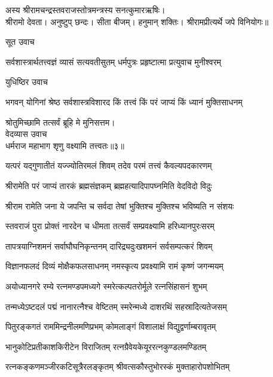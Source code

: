 
\clearpage
{}
अस्य श्रीरामचन्द्रस्तवराजस्तोत्रमन्त्रस्य सनत्कुमारऋषिः। \\
श्रीरामो देवता। अनुष्टुप् छन्दः। सीता बीजम्। हनुमान् शक्तिः। 
श्रीरामप्रीत्यर्थे जपे विनियोगः॥

सूत उवाच

\twolineshloka
{सर्वशास्त्रार्थतत्त्वज्ञं व्यासं सत्यवतीसुतम्}
{धर्मपुत्रः प्रहृष्टात्मा प्रत्युवाच मुनीश्वरम्}%

युधिष्ठिर उवाच

\twolineshloka
{भगवन् योगिनां श्रेष्ठ सर्वशास्त्रविशारद}
{किं तत्त्वं किं परं जाप्यं किं ध्यानं मुक्तिसाधनम्}%

{श्रोतुमिच्छामि तत्सर्वं ब्रूहि मे मुनिसत्तम।}\\
{वेदव्यास उवाच}\\
{धर्मराज महाभाग शृणु वक्ष्यामि तत्त्वतः॥३॥}%

\twolineshloka
{यत्परं यद्गुणातीतं यज्ज्योतिरमलं शिवम्}
{तदेव परमं तत्त्वं कैवल्यपदकारणम्}%

\twolineshloka
{श्रीरामेति परं जाप्यं तारकं ब्रह्मसंज्ञकम्}
{ब्रह्महत्यादिपापघ्नमिति वेदविदो विदुः}%

\twolineshloka
{श्रीराम रामेति जना ये जपन्ति च सर्वदा}
{तेषां भुक्तिश्च मुक्तिश्च भविष्यति न संशयः}%

\twolineshloka
{स्तवराजं पुरा प्रोक्तं नारदेन च धीमता}
{तत्सर्वं सम्प्रवक्ष्यामि हरिध्यानपुरःसरम्}%

\twolineshloka
{तापत्रयाग्निशमनं सर्वाघौघनिकृन्तनम्}
{दारिद्र्यदुःखशमनं सर्वसम्पत्करं शिवम्}%

\twolineshloka
{विज्ञानफलदं दिव्यं मोक्षैकफलसाधनम्}
{नमस्कृत्य प्रवक्ष्यामि रामं कृष्णं जगन्मयम्}%

\twolineshloka
{अयोध्यानगरे रम्ये रत्नमण्डपमध्यगे}
{स्मरेत्कल्पतरोर्मूले रत्नसिंहासनं शुभम्}%

\twolineshloka
{तन्मध्येऽष्टदलं पद्मं नानारत्नैश्च वेष्टितम्}
{स्मरेन्मध्ये दाशरथिं सहस्रादित्यतेजसम्}%

\twolineshloka
{पितुरङ्कगतं राममिन्द्रनीलमणिप्रभम्}
{कोमलाङ्गं विशालाक्षं विद्युद्वर्णाम्बरावृतम्}%

\twolineshloka
{भानुकोटिप्रतीकाशकिरीटेन विराजितम्}
{रत्नग्रैवेयकेयूररत्नकुण्डलमण्डितम्}%

\twolineshloka
{रत्नकङ्कणमञ्जीरकटिसूत्रैरलङ्कृतम्}
{श्रीवत्सकौस्तुभोरस्कं मुक्ताहारोपशोभितम्}%

